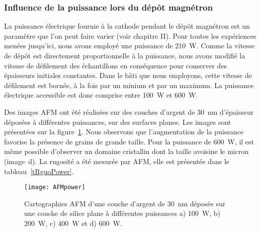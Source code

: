 	\subsubsection{Influence de la puissance lors du dépôt magnétron}
La puissance électrique fournie à la cathode pendant le dépôt magnétron est un paramètre que l'on peut faire varier (voir chapitre II). Pour toutes les expériences menées jusqu'ici, nous avons employé une puissance de 210~W. Comme la vitesse de dépôt est directement proportionnelle à la puissance, nous avons modifié la vitesse de défilement des échantillons en conséquence pour conserver des épaisseurs initiales constantes. Dans le bâti que nous employons, cette vitesse de défilement est bornée, à la fois par un minium et par un maximum. La puissance électrique accessible est donc comprise entre 100~W et 600~W.\par 
Des images AFM ont été réalisées sur des couches d'argent de 30~nm d'épaisseur déposées à différentes puissances, sur des surfaces planes. Les images sont présentées sur la figure~\ref{AFMpower}. Nous observons que l'augmentation de la puissance favorise la présence de grains de grande taille. Pour la puissance de 600~W, il est même possible d'observer un domaine cristallin dont la taille avoisine le micron (image~d). La rugosité a été mesurée par AFM, elle est présentée dans le tableau~\ref{tRguoPower}.\par 
\begin{figure}[!htb]
\centering
\texttt{[image: AFMpower]}
\caption{Cartographies AFM d'une couche d'argent de 30~nm déposée sur une couche de silice plane à différentes puissances a) 100~W, b) 200~W, c) 400~W et d) 600~W.}
\label{AFMpower}
\end{figure}

